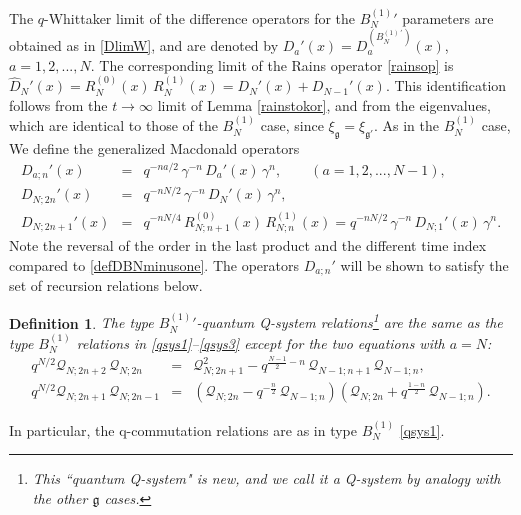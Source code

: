 \documentclass[12pt]{amsart}
\newtheorem{defn}[thm]{Definition}
\newcommand{\g}{{\mathfrak{g}}}
\newcommand{\Q}{{\mathcal Q}}
\numberwithin{equation}{section}
\begin{document}
The $q$-Whittaker limit of the difference operators for the ${B_N^{(1)}}'$ parameters are obtained as in \eqref{DlimW}, and are
%
%
%
%
denoted by $D_{a}'(x)= D_{a}^{(B_N^{(1)\, '})}(x)$, $a=1,2,...,N$. The corresponding limit 
of the Rains operator \eqref{rainsop} is
$\hat{D}_N'(x)= R_N^{(0)}(x)\, R_N^{(1)}(x) =D_N'(x)+D_{N-1}'(x)$. 
This identification follows from the $t\to \infty$ limit of Lemma \ref{rainstokor}, and from the eigenvalues,
%
%
which are identical to those of the $B_N^{(1)}$ case, since $\xi_\g=\xi_{\g'}$. 
%
As in the $B_N^{(1)}$ case, 
We define the generalized Macdonald operators
\begin{eqnarray}
D_{a;n}'(x)&=&q^{-na/2}\, \gamma^{-n}\, D_{a}'(x)\, \gamma^{n}, \qquad (a=1,2,...,N-1),\nonumber \\
D_{N;2n}'(x)&=&q^{-nN/2}\, \gamma^{-n}\, D_{N}'(x)\, \gamma^{n},\nonumber \\
D_{N;2n+1}'(x)&=&q^{-nN/4}\, R_{N;n+1}^{(0)}(x)\, R_{N;n}^{(1)}(x)=q^{-nN/2}\, \gamma^{-n}\, D_{N;1}'(x)\, \gamma^{n}.
\label{defBNprime}
\end{eqnarray}
Note the reversal of the order in the last product and the different time index compared to \eqref{defDBNminusone}. 
%
The operators $D_{a;n}'$ will be shown to satisfy the set of recursion relations below.
\begin{defn}\label{bprimeqsys}
The type ${B_N^{(1)}}'$-quantum Q-system relations\footnote{This ``quantum Q-system" is new, and
%
%
we call it a Q-system by analogy with the other $\g$ cases. 
%
}
are the same as the type $B_N^{(1)}$ relations in \eqref{qsys1}--\eqref{qsys3} except for the two equations with $a=N$:
\begin{eqnarray*}
%
%
%
q^{N/2} \Q_{N;2n+2}\,\Q_{N;2n}&=&\Q_{N;2n+1}^2-q^{\frac{N-1}{2}-n} \,\Q_{N-1;n+1}\,\Q_{N-1;n},\\
q^{N/2} \Q_{N;2n+1}\,\Q_{N;2n-1}&=&(\Q_{N;2n}-q^{-\frac{n}{2}} \,\Q_{N-1;n})(\Q_{N;2n}+q^{\frac{1-n}{2}} \,\Q_{N-1;n}).
\end{eqnarray*}
\end{defn}
\noindent In particular, the q-commutation relations are as in type $B_{N}^{(1)}$ \eqref{qsys1}.
\end{document}
